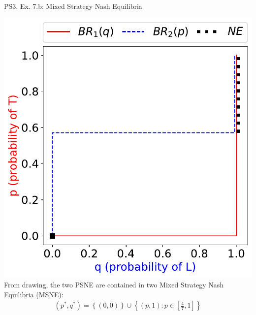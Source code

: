 \begin{frame}{PS3, Ex. 7.b: Mixed Strategy Nash Equilibria}
\begin{multicols}{2}
    \includegraphics[width=\columnwidth]{figures/5b2}
    From drawing, the two PSNE are contained in two Mixed Strategy Nash Equilibria (MSNE):
    \begin{align*}
      (p^{*},q^{*})=\left\{(0,0)\right\}\cup\left\{(p,1):p\in\left[\frac{4}{7},1\right]\right\}
    \end{align*}
  \vfill\null
  \end{multicols}
\end{frame}
